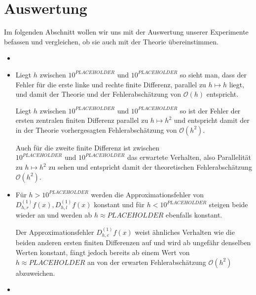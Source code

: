 \documentclass{scrartcl}
\newcommand{\BigO}{\mathcal{O}}
\theoremstyle{remark}
\begin{document}


\section{Auswertung}
Im folgenden Abschnitt wollen wir uns mit der Auswertung unserer Experimente
befassen und vergleichen, ob sie auch mit der Theorie übereinstimmen.


\begin{itemize}
    \item %

    \item Liegt \(h\) zwischen \(10^{ PLACEHOLDER } \text{ und } 10^{
          PLACEHOLDER } \) so sieht man, dass der Fehler für die erste linke
          und rechte finite Differenz, parallel zu \(h \mapsto h\) liegt, und
          damit der Theorie und der Fehlerabschätzung von \(\BigO(h)\)
          entspricht.

          Liegt \(h\) zwischen \(10^{ PLACEHOLDER } \text{ und } 10^{
          PLACEHOLDER } \) so ist der Fehler der ersten zentralen finiten
          Differenz parallel zu \(h \mapsto h^2\) und entspricht damit der in
          der Theorie vorhergesagten Fehlerabschätzung von \(\BigO(h^2)\).

          Auch für die zweite finite Differenz ist zwischen \(10^{ PLACEHOLDER
          } \text{ und } 10^{ PLACEHOLDER }\) das erwartete Verhalten, also
          Parallelität zu \(h \mapsto h^2\) zu sehen und entspricht damit der
          theoretischen Fehlerabschätzung \(\BigO(h^2)\).

    \item Für \(h > 10^{ PLACEHOLDER } \) werden die Approximationsfehler von
          \(D_{h, r}^{(1)}f(x), D_{h, l}^{(1)}f(x)\) konstant und für \(h <
          10^{ PLACEHOLDER } \) steigen beide wieder an und werden ab \(h
          \approx PLACEHOLDER \) ebenfalls konstant.

          Der Approximationsfehler \(D_{h, c}^{(1)}f(x)\) weist ähnliches
          Verhalten wie die beiden anderen ersten finiten Differenzen auf und
          wird ab ungefähr denselben Werten konstant, fängt jedoch bereits ab
          einem Wert von \(h \approx PLACEHOLDER\) an von der erwarten
          Fehlerabschätzung \(\BigO(h^2)\) abzuweichen.

    \item %
\end{itemize}
\end{document}
